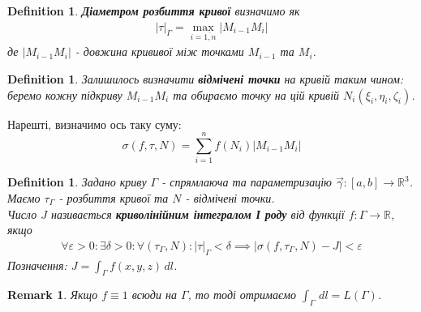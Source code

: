 \documentclass[a4paper, 10pt]{article}
\def\huge{\displaystyle}
\theoremstyle{theoremdd}
\theoremstyle{theoremdd}
\newtheorem{definition}[theorem]{Definition}
\theoremstyle{theoremdd}
\theoremstyle{theoremdd}
\theoremstyle{theoremdd}
\theoremstyle{theoremdd}
\newtheorem{remark}[theorem]{Remark}
\theoremstyle{theoremdd}
\theoremstyle{theoremdd}
\newcommand\Norm[1]{\left\lVert#1\right\rVert}
\begin{document}
\begin{definition}
\textbf{Діаметром розбиття кривої} визначимо як
\begin{align*}
| \tau |_\Gamma = \max_{i = \overline{1,n}} |M_{i-1}M_{i}|
\end{align*}
де $|M_{i-1}M_i|$ - довжина крививої між точками $M_{i-1}$ та $M_i$.
\end{definition}

\begin{definition}
Залишилось визначити \textbf{відмічені точки} на кривій таким чином: беремо кожну підкриву $M_{i-1}M_i$ та обираємо точку на цій кривій $N_i(\xi_i,\eta_i,\zeta_i)$.
\end{definition}

Нарешті, визначимо ось таку суму:
$$ \sigma(f,\tau,N) = \displaystyle\sum_{i=1}^n f(N_i) |M_{i-1}M_i|$$

\begin{definition}
Задано криву $\Gamma$ - спрямлаюча та параметризацію $\vec{\gamma}: [a,b] \to \mathbb{R}^3$. Маємо $\tau_\Gamma$ - розбиття кривої та $N$ - відмічені точки.\\
Число $J$ називається \textbf{криволінійним інтегралом І роду} від функції $f: \Gamma \to \mathbb{R}$, якщо
\begin{align*}
\forall \varepsilon > 0: \exists \delta > 0: \forall (\tau_\Gamma, N): |\tau|_\Gamma < \delta \implies |\sigma(f,\tau_\Gamma,N) - J| < \varepsilon
\end{align*}
Позначення: $J = \displaystyle\int_\Gamma f(x,y,z)\,dl$.
\end{definition}

\iffalse
\begin{definition}
Задано функцію $\vec{\gamma}: [a,b] \to \mathbb{R}^3$. Нехай крива $\Gamma = \vec{\gamma}([a,b])$ - неособлива та гладка.\\
Число $J$ називається \textbf{криволінійним інтегралом I роду} від функції $f: \Gamma \to \mathbb{R}$ вздовж кривої $\Gamma$, якщо
\begin{align*}
\forall \varepsilon > 0: \exists \delta > 0: \forall (\tau,\xi): |\tau| < \delta \implies |\sigma(\tau,\xi,(f \circ \gamma \cdot \Norm{\vec{\gamma}'})) - J| < \varepsilon
\end{align*}
Позначення: $J = \huge\int_\Gamma f(x,y,z)\,dl$
\end{definition}
\fi

\begin{remark}
Якщо $f \equiv 1$ всюди на $\Gamma$, то тоді отримаємо $\displaystyle\int_\Gamma \,dl = L(\Gamma)$.
\end{remark}
\end{document}
